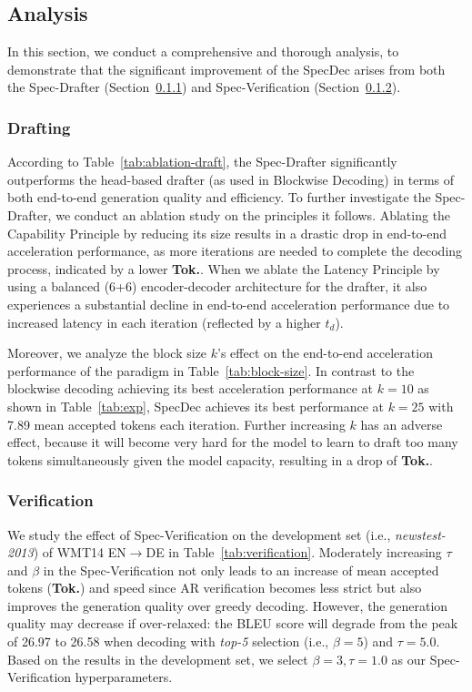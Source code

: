 \subsection{Analysis}
In this section, we conduct a comprehensive and thorough analysis, to demonstrate that the significant improvement of the SpecDec arises from both the Spec-Drafter (Section~\ref{subsubsec:draft_analysis}) and Spec-Verification (Section~\ref{subsubsec:verify_analysis}).

\subsubsection{Drafting}\label{subsubsec:draft_analysis}
According to Table~\ref{tab:ablation-draft}, the Spec-Drafter significantly outperforms the head-based drafter (as used in Blockwise Decoding) in terms of both end-to-end generation quality and efficiency. To further investigate the Spec-Drafter, we conduct an ablation study on the principles it follows. Ablating the Capability Principle by reducing its size results in a drastic drop in end-to-end acceleration performance, as more iterations are needed to complete the decoding process, indicated by a lower \textbf{Tok.}. When we ablate the Latency Principle by using a balanced (6+6) encoder-decoder architecture for the drafter, it also experiences a substantial decline in end-to-end acceleration performance due to increased latency in each iteration (reflected by a higher $t_d$).    

Moreover, we analyze the block size $k$'s effect on the end-to-end acceleration performance of the paradigm in Table~\ref{tab:block-size}. In contrast to the blockwise decoding achieving its best acceleration performance at $k=10$ as shown in Table~\ref{tab:exp}, SpecDec achieves its best performance at $k=25$ with 7.89 mean accepted tokens each iteration.  Further increasing $k$ has an adverse effect, because it will become very hard for the model to learn to draft too many tokens simultaneously given the model capacity, resulting in a drop of \textbf{Tok.}. 

\subsubsection{Verification}\label{subsubsec:verify_analysis}
We study the effect of Spec-Verification on the development set (i.e., \textit{newstest-2013}) of WMT14 EN$\rightarrow$DE in Table~\ref{tab:verification}. Moderately increasing $\tau$ and $\beta$ in the Spec-Verification not only leads to an increase of mean accepted tokens (\textbf{Tok.}) and speed since AR verification becomes less strict but also improves the generation quality over greedy decoding. However, the generation quality may decrease if over-relaxed: the BLEU score will degrade from the peak of 26.97 to 26.58 when decoding with \textit{top-5} selection (i.e., $\beta=5$) and $\tau=5.0$. Based on the results in the development set, we select $\beta=3, \tau=1.0$ as our Spec-Verification hyperparameters.

